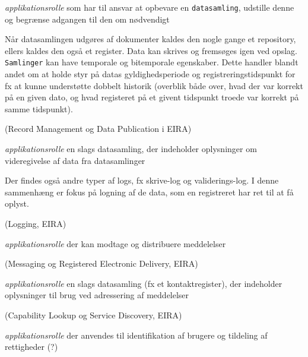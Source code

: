 \begin{description}
\tightlist
\item[Datasamling (dataservice?)]
\emph{applikationsrolle} som har til ansvar at opbevare en
\texttt{datasamling}, udstille denne og begrænse adgangen til den om
nødvendigt
\end{description}

Når datasamlingen udgøres af dokumenter kaldes den nogle gange et
repository, ellers kaldes den også et register. Data kan skrives og
fremsøges igen ved opslag. \texttt{Samlinger} kan have temporale og
bitemporale egenskaber. Dette handler blandt andet om at holde styr på
datas gyldighedsperiode og registreringstidspunkt for fx at kunne
understøtte dobbelt historik (overblik både over, hvad der var korrekt
på en given dato, og hvad registeret på et givent tidspunkt troede var
korrekt på samme tidspunkt).

(Record Management og Data Publication i EIRA)

\begin{description}
\tightlist
\item[Log (adgangslog? anvendelseslog?)]
\emph{applikationsrolle} en slags datasamling, der indeholder
oplysninger om videregivelse af data fra datasamlinger
\end{description}

Der findes også andre typer af logs, fx skrive-log og validerings-log. I
denne sammenhæng er fokus på logning af de data, som en registreret har
ret til at få oplyst.

(Logging, EIRA)

\begin{description}
\tightlist
\item[Forsendelse]
\emph{applikationsrolle} der kan modtage og distribuere meddelelser
\end{description}

(Messaging og Registered Electronic Delivery, EIRA)

\begin{description}
\tightlist
\item[Adresse]
\emph{applikationsrolle} en slags datasamling (fx et kontaktregister),
der indeholder oplysninger til brug ved adressering af meddelelser
\end{description}

(Capability Lookup og Service Discovery, EIRA)

\begin{description}
\tightlist
\item[Id/Rettighed (Brugerstyring?)]
\emph{applikationsrolle} der anvendes til identifikation af brugere og
tildeling af rettigheder (?)
\end{description}

